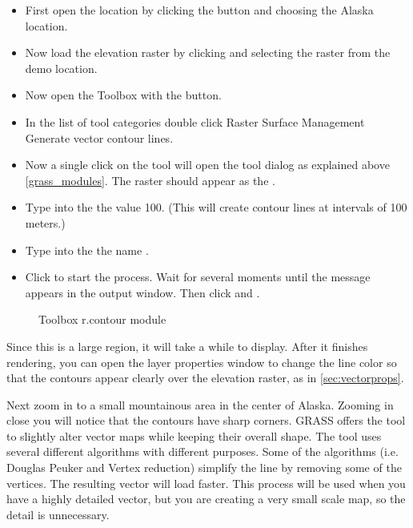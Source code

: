 \begin{itemize}[label=--]
\item First open the location by clicking the
 button and choosing the Alaska
location.
\item Now load the  elevation raster by clicking
 and selecting the
 raster from the demo location.
\item Now open the Toolbox with the  button.
\item In the list of tool categories double click Raster \arrow Surface
Management \arrow Generate vector contour lines.
\item Now a single click on the tool  will open
the tool dialog as explained above \ref{grass_modules}. The
 raster should appear as the .
\item Type into the  the
value 100. (This will create contour lines at intervals of
100 meters.)
\item Type into the 
the name .
\item Click  to start the process. Wait for several moments until
the message  appears in the output window.
Then click  and .
\end{itemize}

\begin{figure}[ht]
\centering
    \hspace{0.5cm}
   \caption{\grass Toolbox r.contour module \nixcaption}\label{fig:grass_toolbox_rcontour}
\end{figure}

Since this is a large region, it will take a while to display. After it
finishes rendering, you can open the layer properties window to change the
line color so that the contours appear clearly over the elevation raster, as
in \ref{sec:vectorprops}.

Next zoom in to a small mountainous area in the center of Alaska.
Zooming in close you will notice that the contours have sharp corners. GRASS
offers the  tool to slightly alter vector maps while
keeping their overall shape. The tool uses several different algorithms with
different purposes. Some of the algorithms (i.e. Douglas Peuker and Vertex
reduction) simplify the line by removing some of the vertices. The resulting
vector will load faster. This process will be used when you have a highly
detailed vector, but you are creating a very small scale map, so the detail
is unnecessary.

